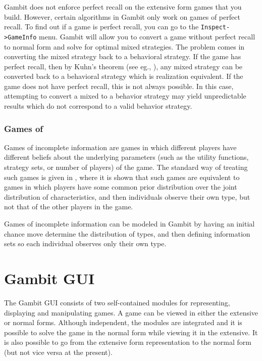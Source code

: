 \documentclass[12pt]{report}
\begin{document}
Gambit does not enforce perfect recall on the extensive form games that
you build.  However, certain algorithms in Gambit only work on games of 
perfect recall.  
To find out if a game is perfect recall, you can go to the {\tt Inspect->GameInfo} 
menu.  Gambit will allow you to convert a game without perfect recall 
to normal form and solve for optimal 
mixed strategies.  The problem comes in converting the mixed strategy back
to a behavioral strategy.  If the game has perfect recall, then by Kuhn's 
theorem (see eg., \cite{vanDamme:1983}), any mixed strategy can be 
converted back to a behavioral strategy which is realization equivalent.   
If the game does not have perfect recall, this is not always possible.  
In this case, attempting to convert a mixed to a behavior strategy 
may yield unpredictable results which do not correspond to a valid 
behavior strategy.   

\subsection{Games of }\label{incinfsec}
Games of incomplete information are games in which different players have 
different beliefs about the underlying parameters (such as the utility 
functions, strategy sets, or number of players) of the game.  The standard 
way of treating such games is given in \cite{Harsanyi:1967}, where it
is shown that 
 such games are equivalent to games in which players have some common
prior distribution over the joint distribution of characteristics, and
 then individuals observe their own type, but not that of the other players 
in the game.  

Games of incomplete information can be modeled in Gambit by having an
initial chance move determine the distribution of types, and then
defining information sets so each individual observes only their own
type.

\chapter{Gambit GUI}

The Gambit GUI consists of two self-contained modules for
representing, displaying and manipulating games.  A game can be viewed
in either the extensive or normal forms.  Although independent, the
modules are integrated and it is possible to solve the game
in the normal form while viewing it in the extensive.  It is also
possible to go from the extensive form representation to the normal
form (but not vice versa at the present).  
\end{document}

